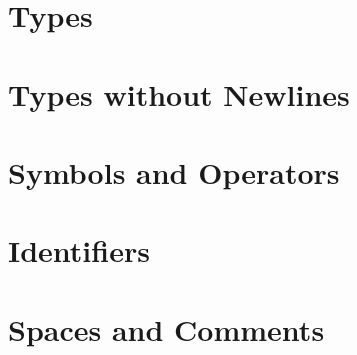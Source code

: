 \section{Types}


\section{Types without Newlines}


\section{Symbols and Operators}


\section{Identifiers}


\section{Spaces and Comments}


\normalsize
